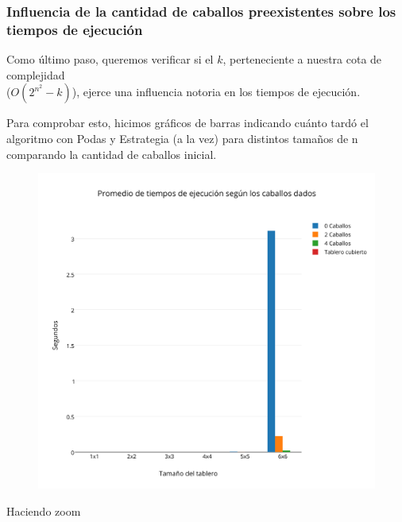 
\newpage
\subsubsection{Influencia de la cantidad de caballos preexistentes sobre los tiempos de ejecuci\'on}


Como último paso, queremos verificar si el $k$, perteneciente a nuestra cota de complejidad\\
($O(2^{n^2}-k)$), ejerce una influencia notoria en los tiempos de ejecución.

Para comprobar esto, hicimos gráficos de barras indicando cuánto tardó el algoritmo con Podas y Estrategia (a la vez) para distintos tamaños de n comparando la cantidad de caballos inicial.

\begin{figure}[h!]
   \begin{center}
\includegraphics[scale=0.3]{../src/ej3/Mediciones/Barras1.png} 
   \end{center}
 \end{figure}

\newpage
 
Haciendo zoom

